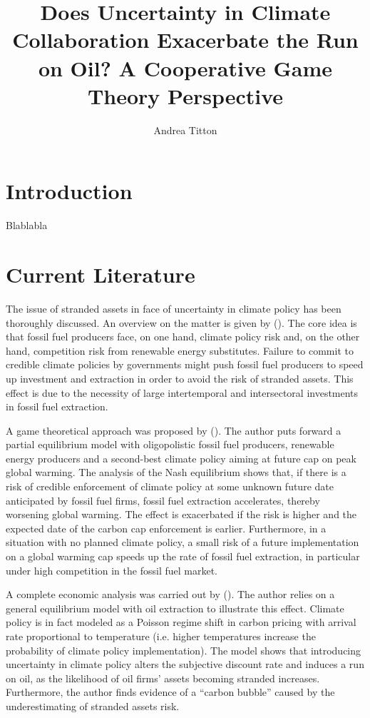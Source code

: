 \documentclass[american]{scrartcl}
\title{Does Uncertainty in Climate Collaboration Exacerbate the Run on Oil? A Cooperative Game Theory Perspective}
\author{Andrea Titton}
\newcommand{\citein}[1]{\citeauthor{#1} (\citeyear{#1})}
\begin{document}
\clearpage
\thispagestyle{empty}
\maketitle
\clearpage



\section{Introduction}

Blablabla

\section{Current Literature}

The issue of stranded assets in face of uncertainty in climate policy has been thoroughly discussed. An overview on the matter is given by \citein{Ploeg2020}. The core idea is that fossil fuel producers face, on one hand, climate policy risk and, on the other hand, competition risk from renewable energy substitutes. Failure to commit to credible climate policies by governments might push fossil fuel producers to speed up investment and extraction in order to avoid the risk of stranded assets. This effect is due to the necessity of large intertemporal and intersectoral investments in fossil fuel extraction.

A game theoretical approach was proposed by \citein{Ploeg2020b}. The author puts forward a partial equilibrium model with oligopolistic fossil fuel producers, renewable energy producers and a second-best climate policy aiming at future cap on peak global warming. The analysis of the Nash equilibrium shows that, if there is a risk of credible enforcement of climate policy at some unknown future date anticipated by fossil fuel firms, fossil fuel extraction accelerates, thereby worsening global warming. The effect is exacerbated if the risk is higher and the expected date of the carbon cap enforcement is earlier. Furthermore, in a situation with no planned climate policy, a small risk of a future implementation on a global warming cap speeds up the rate of fossil fuel extraction, in particular under high competition in the fossil fuel market.

A complete economic analysis was carried out by \citein{Barnett2019}. The author relies on a general equilibrium model with oil extraction to illustrate this effect. Climate policy is in fact modeled as a Poisson regime shift in carbon pricing with arrival rate proportional to temperature (i.e. higher temperatures increase the probability of climate policy implementation). The model shows that introducing uncertainty in climate policy alters the subjective discount rate and induces a run on oil, as the likelihood of oil firms' assets becoming stranded increases. Furthermore, the author finds evidence of a ``carbon bubble'' caused by the underestimating of stranded assets risk.
\end{document}
